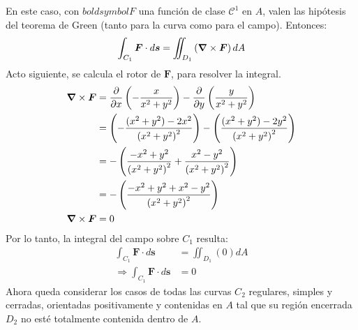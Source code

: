 \begin{solution}
\begin{center}
\begin{tikzpicture}
        \end{tikzpicture}
    \end{center}
    En este caso, con $boldsymbol{F}$ una función de clase
    $\mathcal{C}^1$ en $A$, valen las hipótesis del teorema de Green (tanto para la curva como para el campo). Entonces:
    \begin{equation*}
        \int_{C_1}\boldsymbol{F}\cdot d\boldsymbol{s} = \iint_{D_1}\left(\grad \times \boldsymbol{F}\right)dA
    \end{equation*}
    Acto siguiente, se calcula el rotor de $\boldsymbol{F}$, para resolver la integral.
    \begin{align*}
        \grad \times \boldsymbol{F} &= \partialx\left( -\frac{x}{x^2+y^2}\right) - \partialy\left(\frac{y}{x^2+y^2}\right)\\
        &= \left(-\frac{(x^2+y^2)-2x^2}{\left(x^2+y^2\right)^2}\right) - \left(\frac{(x^2+y^2)-2y^2}{\left(x^2+y^2\right)^2}\right)\\
        &= -\left(\frac{-x^2+y^2}{\left(x^2+y^2\right)^2}+\frac{x^2-y^2}{\left(x^2+y^2\right)^2}\right)\\
        &= -\left(\frac{-x^2+y^2+x^2-y^2}{\left(x^2+y^2\right)^2}\right)\\
        \grad \times \boldsymbol{F}&= 0
    \end{align*}
    Por lo tanto, la integral del campo sobre $C_1$ resulta:
    \begin{align*}
        \int_{C_1}\boldsymbol{F}\cdot d\boldsymbol{s} &= \iint_{D_1}\left(0\right)dA\\
        \Rightarrow \int_{C_1}\boldsymbol{F}\cdot d\boldsymbol{s} &= 0
    \end{align*}
    Ahora queda considerar los casos de todas las curvas $C_2$ regulares, simples y cerradas, orientadas positivamente
    y contenidas en $A$ tal que su región encerrada $D_2$ no esté totalmente contenida dentro de $A$.
    \begin{center}
\end{center}
\end{solution}
